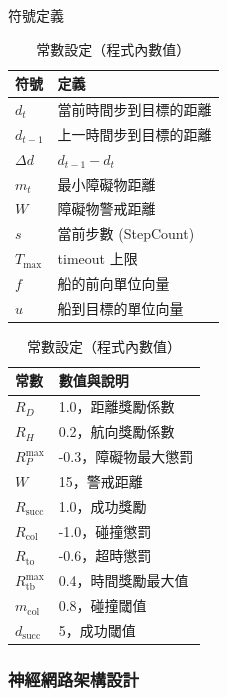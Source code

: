 \documentclass[12pt,a4paper]{article}
\begin{document}
\renewcommand{\arraystretch}{1.3} %
\begin{table}[h!]
\centering
\begin{minipage}{0.48\textwidth}
\centering
\caption{符號定義}
\vspace*{0.2cm}
\begin{tabular}{ll}
\hline
\textbf{符號} & \textbf{定義} \\
\hline
$d_t$ & 當前時間步到目標的距離 \\
$d_{t-1}$ & 上一時間步到目標的距離 \\
$\Delta d$ & $d_{t-1} - d_t$ \\
$m_t$ & 最小障礙物距離 \\
$W$ & 障礙物警戒距離 \\
$s$ & 當前步數 (StepCount) \\
$T_{\max}$ & timeout 上限 \\
$f$ & 船的前向單位向量 \\
$u$ & 船到目標的單位向量 \\
\hline
\end{tabular}
\end{minipage}
\hfill
\begin{minipage}{0.48\textwidth}
\centering
\caption{常數設定（程式內數值）}
\vspace*{0.2cm}
\begin{tabular}{ll}
\hline
\textbf{常數} & \textbf{數值與說明} \\
\hline
$R_D$ & 1.0，距離獎勵係數 \\
$R_H$ & 0.2，航向獎勵係數 \\
$R_P^{\max}$ & -0.3，障礙物最大懲罰 \\
$W$ & 15，警戒距離 \\
$R_{\text{succ}}$ & 1.0，成功獎勵 \\
$R_{\text{col}}$ & -1.0，碰撞懲罰 \\
$R_{\text{to}}$ & -0.6，超時懲罰 \\
$R_{\text{tb}}^{\max}$ & 0.4，時間獎勵最大值 \\
$m_{\text{col}}$ & 0.8，碰撞閾值 \\
$d_{\text{succ}}$ & 5，成功閾值 \\
\hline
\end{tabular}
\end{minipage}
\end{table}

\newpage

\subsubsection{神經網路架構設計}
\end{document}
